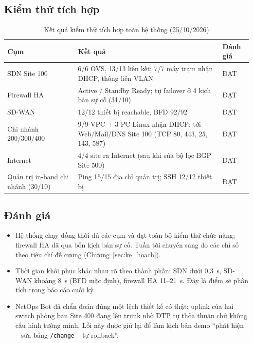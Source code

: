 \subsection{Kiểm thử tích hợp}

\begin{table}[H]
    \centering
    \small
    \caption{Kết quả kiểm thử tích hợp toàn hệ thống (25/10/2026)}
    \label{tab:tich_hop}
    \begin{tabularx}{\textwidth}{|P{3.6cm}|X|P{1.6cm}|}
        \hline
        \textbf{Cụm} & \textbf{Kết quả} & \textbf{Đánh giá} \\
        \hline
        SDN Site 100 & 6/6 OVS, 13/13 liên kết; 7/7 máy trạm nhận DHCP, thông liên VLAN & ĐẠT \\
        \hline
        Firewall HA & Active / Standby Ready; tự failover ở 4 kịch bản sự cố (31/10) & ĐẠT \\
        \hline
        SD-WAN & 12/12 thiết bị reachable, BFD 92/92 & ĐẠT \\
        \hline
        Chi nhánh 200/300/400 & 9/9 VPC + 3 PC Linux nhận DHCP; tới Web/Mail/DNS Site 100 (TCP 80, 443, 25, 143, 587) & ĐẠT \\
        \hline
        Internet & 4/4 site ra Internet (sau khi sửa bộ lọc BGP Site 500) & ĐẠT \\
        \hline
        Quản trị in-band chi nhánh (30/10) & Ping 15/15 địa chỉ quản trị; SSH 12/12 thiết bị & ĐẠT \\
        \hline
    \end{tabularx}
\end{table}

\subsection{Đánh giá}

\begin{itemize}
    \item Hệ thống chạy đồng thời đủ các cụm và đạt toàn bộ kiểm thử chức năng; firewall HA đã qua bốn kịch bản sự cố. Tuần tới chuyển sang đo các chỉ số theo tiêu chí đề cương (Chương~\ref{sec:ke_hoach}).
    \item Thời gian khôi phục khác nhau rõ theo thành phần: SDN dưới 0,3~s, SD-WAN khoảng 8~s (BFD mặc định), firewall HA 11--21~s. Đây là điểm sẽ phân tích trong báo cáo cuối kỳ.
    \item NetOps Bot đã chẩn đoán đúng một lệch thiết kế có thật: uplink của hai switch phòng ban Site 400 đang lên trunk nhờ DTP tự thỏa thuận chứ không cấu hình tường minh. Lỗi này được giữ lại để làm kịch bản demo ``phát hiện -- sửa bằng \texttt{/change} -- tự rollback''.
\end{itemize}

